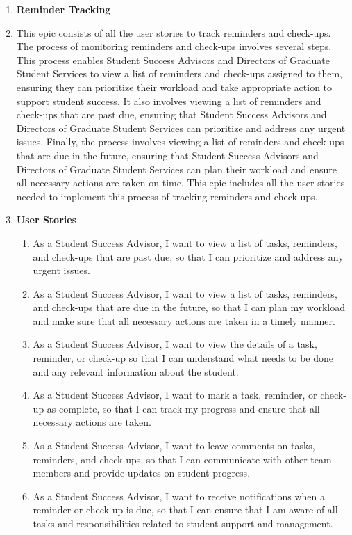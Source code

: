 \documentclass[12pt]{article}
\begin{document}
\begin{appendices}
\begin{enumerate}[label=(\roman*)]
        \item \textbf{Reminder Tracking}
        \item[] This epic consists of all the user stories to track reminders and check-ups. The process of monitoring reminders and check-ups involves several steps. This process enables Student Success Advisors and Directors of Graduate Student Services to view a list of reminders and check-ups assigned to them, ensuring they can prioritize their workload and take appropriate action to support student success. It also involves viewing a list of reminders and check-ups that are past due, ensuring that Student Success Advisors and Directors of Graduate Student Services can prioritize and address any urgent issues. Finally, the process involves viewing a list of reminders and check-ups that are due in the future, ensuring that Student Success Advisors and Directors of Graduate Student Services can plan their workload and ensure all necessary actions are taken on time. This epic includes all the user stories needed to implement this process of tracking reminders and check-ups.
        \item[] \textbf{User Stories}
        \begin{enumerate}
            \item As a Student Success Advisor, I want to view a list of tasks, reminders, and check-ups that are past due, so that I can prioritize and address any urgent issues.
            \item As a Student Success Advisor, I want to view a list of tasks, reminders, and check-ups that are due in the future, so that I can plan my workload and make sure that all necessary actions are taken in a timely manner.
            \item As a Student Success Advisor, I want to view the details of a task, reminder, or check-up so that I can understand what needs to be done and any relevant information about the student.
            \item As a Student Success Advisor, I want to mark a task, reminder, or check-up as complete, so that I can track my progress and ensure that all necessary actions are taken.
            \item As a Student Success Advisor, I want to leave comments on tasks, reminders, and check-ups, so that I can communicate with other team members and provide updates on student progress.
            \item As a Student Success Advisor, I want to receive notifications when a reminder or check-up is due, so that I can ensure that I am aware of all tasks and responsibilities related to student support and management.                                              
        \end{enumerate}
    \end{enumerate}


\end{appendices}
\end{document}

